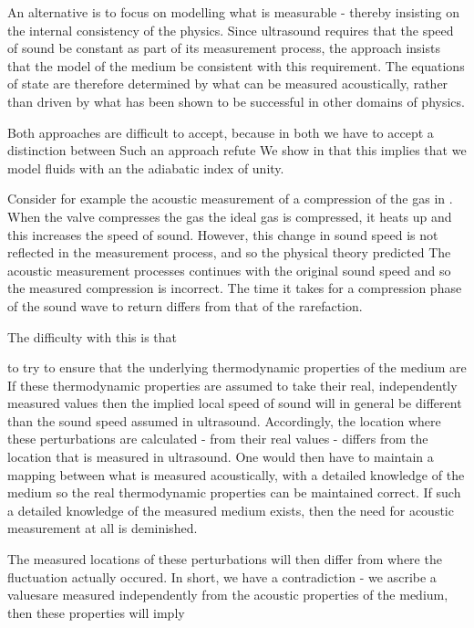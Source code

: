 An alternative is to focus on modelling what is measurable - thereby insisting on the internal consistency of the physics.
Since ultrasound requires that the speed of sound be constant as part of its measurement process, 
the approach insists that the  model of the medium be consistent with this requirement.
The equations of state are therefore determined by what can be measured acoustically, 
rather than driven by what has been shown to be successful in other domains of physics.

Both approaches are difficult to accept, 
because in both we have to accept a distinction between 
Such an approach refute 
We show in  that this implies that we model fluids with an the adiabatic index of unity.



Consider for example the acoustic measurement of a compression of the gas in .
When the valve compresses the gas the  ideal gas is compressed, it heats up and this increases the speed of sound. 
However, this change in sound speed is not reflected in the measurement process, and so the physical theory predicted 
The acoustic measurement processes continues with the original sound speed and so the measured compression is incorrect.  
The time it takes for a compression phase of the sound wave to return differs from that of the rarefaction.  


The difficulty with this is that 

 to try to ensure that the underlying thermodynamic properties of the medium are
If these thermodynamic properties are assumed to take their real, independently measured values then the implied local speed of sound will in general be different than the sound speed assumed in ultrasound.  
Accordingly, the location where these perturbations are calculated - from their real values - differs from the location that is measured in ultrasound.  
One would then have to maintain a mapping between what is measured acoustically, with a detailed knowledge of the medium so the real thermodynamic properties can be maintained correct.
If such a detailed knowledge of the measured medium exists, then the need for acoustic measurement at all is deminished.




The measured locations of these perturbations will then differ from where the fluctuation actually occured.  In short, we have a contradiction - we ascribe a   valuesare measured independently from the acoustic properties of the medium, 
then these properties will imply 




